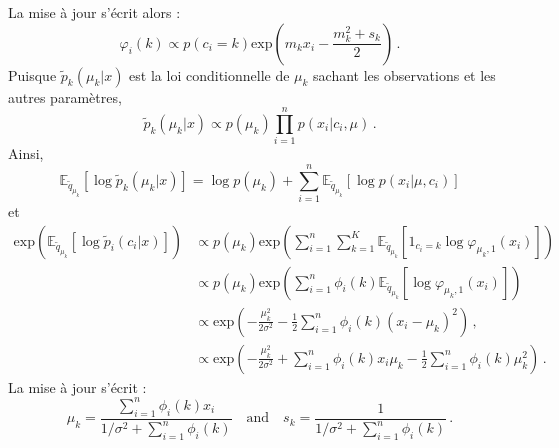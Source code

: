 \documentclass[a4paper,10pt,fleqn]{article}
\newcommand{\1}{\ensuremath{\mathbbm{1}}}
\begin{document}
La mise \`a jour s'\'ecrit alors :
$$
\varphi_i(k) \propto p(c_i=k) \mathrm{exp}\left(m_k x_i - \frac{m^2_k + s_k}{2}\right)\,.
$$
Puisque $\tilde p_k(\mu_k|x)$ est la loi conditionnelle de $\mu_k$ sachant les observations et les autres param\`etres,
$$
\tilde p_k(\mu_k|x) \propto p(\mu_k)\prod_{i=1}^np(x_i|c_i,\mu) \,. 
$$
Ainsi,
$$
\mathbb{E}_{\tilde q_{\mu_k}}[\log \tilde p_k(\mu_k|x)] = \log p(\mu_k) + \sum_{i=1}^n \mathbb{E}_{\tilde q_{\mu_k}}[\log p(x_i|\mu,c_i)]
$$
et
\begin{align*}
\mathrm{exp}\left(\mathbb{E}_{\tilde q_{\mu_k}}[\log \tilde p_i(c_i|x)]\right) &\propto p(\mu_k) \mathrm{exp}\left(\sum_{i=1}^n\sum_{k=1}^K  \mathbb{E}_{\tilde q_{\mu_k}}[1_{c_i=k}\log \varphi_{\mu_k,1}(x_i)]\right)\,\\
&\propto p(\mu_k) \mathrm{exp}\left(\sum_{i=1}^n \phi_i(k) \mathbb{E}_{\tilde q_{\mu_k}}[\log \varphi_{\mu_k,1}(x_i)]\right)\,\\
&\propto \mathrm{exp}\left(-\frac{\mu_k^2}{2\sigma^2}-\frac{1}{2}\sum_{i=1}^n \phi_i(k)(x_i-\mu_k)^2\right)\,,\\
&\propto \mathrm{exp}\left(-\frac{\mu_k^2}{2\sigma^2}+\sum_{i=1}^n \phi_i(k)x_i\mu_k - \frac{1}{2}\sum_{i=1}^n \phi_i(k)\mu^2_k\right)\,.
\end{align*}
La mise \`a jour s'\'ecrit :
$$
\mu_k = \frac{\sum_{i=1}^n \phi_i(k)x_i}{1/\sigma^2 + \sum_{i=1}^n \phi_i(k)}\quad\mathrm{and}\quad s_k = \frac{1}{1/\sigma^2 + \sum_{i=1}^n \phi_i(k)}\,. 
$$
\end{document}
